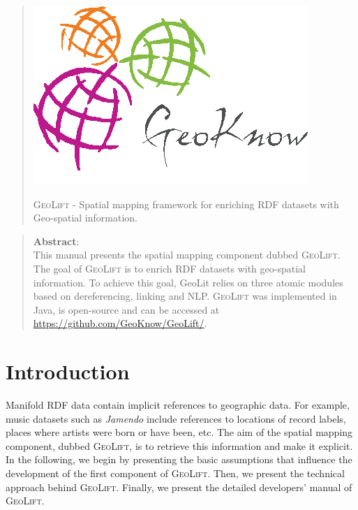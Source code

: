\documentclass[a4paper,twoside,bibtotoc,abstracton,12pt,BCOR=15mm]{article}
\newcommand{\geolift}{\textsc{GeoLift}\xspace}
\begin{document}


\vspace*{\fill} 
\begin{quote} 
\centering 
\begin{center}
 \includegraphics[scale=0.5]{images/geoknow.png}
\end{center}
\begin{flushleft}
 \Large{\geolift}
 \small{ - Spatial mapping framework for enriching RDF datasets with Geo-spatial information.}
\end{flushleft}
\end{quote}
\vspace*{\fill}
\newpage

\vspace*{\fill} 
\begin{quote} 
\centering 
\textbf{Abstract}: \\
This manual presents the spatial mapping component dubbed \geolift. 
The goal of \geolift is to enrich RDF datasets with geo-spatial information. 
To achieve this goal, GeoLit relies on three atomic modules based on dereferencing, linking and NLP. 
\geolift was implemented in Java, is open-source and can be accessed at \url{https://github.com/GeoKnow/GeoLift/}. 
\end{quote}
\vspace*{\fill}

\newpage
\tableofcontents
\newpage

\section{Introduction}
Manifold RDF data contain implicit references to geographic data.
For example, music datasets such as \emph{Jamendo} include references to locations of record labels, places where artists were born or have been, etc.
The aim of the spatial mapping component, dubbed \geolift, is to retrieve this information and make it explicit.
In the following, we begin by presenting the basic assumptions that influence the development of the first component of \geolift.
Then, we present the technical approach behind \geolift.
Finally, we present the detailed developers' manual of \geolift.
\end{document}
